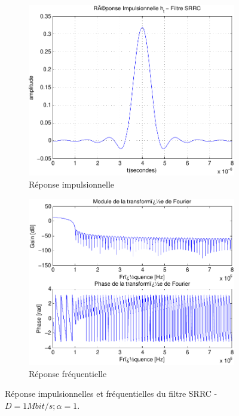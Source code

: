 \documentclass[a4paper,11pt]{article}
\begin{document}
\begin{figure}[htb]
	\begin{subfigure}{.5\textwidth}
  		\centering
  		\includegraphics[width=1\linewidth]{impul_srrc_alpha_1-crop.pdf}
  		\caption{Réponse impulsionnelle}
  		\label{fig:srrc_impul1M_alp1}
	\end{subfigure}
	\begin{subfigure}{.5\textwidth}
  		\centering
  		\includegraphics[width=1\linewidth]{frec_srrc_alpha_1-crop.pdf}
  		\caption{Réponse fréquentielle}
  		\label{fig:srrc_frec1M_alp1}
	\end{subfigure}%
	\caption{Réponse impulsionnelles et fréquentielles du filtre SRRC - $D=1Mbit/s ; \alpha =1$.}
	\label{fig:srrc1M_alp1}
\end{figure}
  
\end{document}
